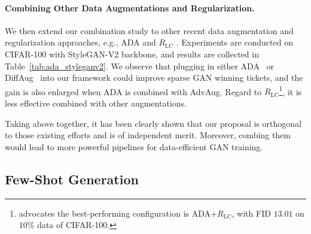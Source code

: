 \documentclass{article}
\newcommand{\TL}[1]{\textcolor{Tianlong_color}{TL:#1}}
\begin{document}
\paragraph{Combining Other Data Augmentations and Regularization.} We then extend our combination study to other recent data augmentation and regularization approaches, e.g., ADA \citep{karras2020training} and $R_{\mathrm{LC}}$ \cite{tseng2021regularizing}. Experiments are conducted on CIFAR-100 with StyleGAN-V2 backbone, and results are collected in Table~\ref{tab:ada_styleganv2}. We observe that plugging in either ADA~\citep{karras2020training} or DiffAug~\cite{zhao2020diffaugment} into our framework could improve sparse GAN winning tickets, and the gain is also enlarged when ADA is combined with AdvAug. Regard to $R_{\mathrm{LC}}$\footnote{\citep{tseng2021regularizing} advocates the best-performing configuration is ADA+$R_{\mathrm{LC}}$, with FID $13.01$ on $10\%$ data of CIFAR-100.}, it is less effective combined with other augmentations.


Taking above together, it has been clearly shown that our proposal is orthogonal to those existing efforts and is of independent merit. Moreover, combing them would lead to more powerful pipelines for data-efficient GAN training.




\subsection{Few-Shot Generation} \label{sec:fewshot}
\end{document}
